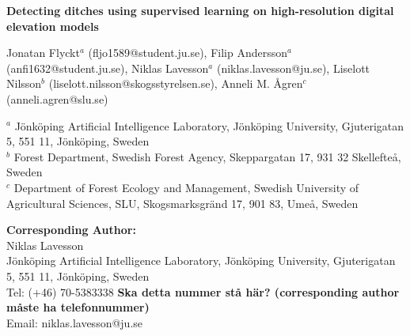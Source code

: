 \documentclass[11pt, review]{elsarticle} %
\begin{document}
\begin{frontmatter}


\begin{titlepage}
\begin{center}
\vspace*{1cm}

\textbf{ \large Detecting ditches using supervised learning on high-resolution digital elevation models}

\vspace{1.5cm}

Jonatan Flyckt$^{a}$ (fljo1589@student.ju.se), Filip Andersson$^{a}$ (anfi1632@student.ju.se), Niklas Lavesson$^a$ (niklas.lavesson@ju.se), Liselott Nilsson$^b$ (liselott.nilsson@skogsstyrelsen.se), Anneli M. \AA gren$^c$ (anneli.agren@slu.se) \\

\hspace{10pt}

\begin{flushleft}
\small  
$^a$ J\"onk\"oping Artificial Intelligence Laboratory, J\"onk\"oping University, Gjuterigatan 5, 551 11, J\"onk\"oping, Sweden \\
$^b$ Forest Department, Swedish Forest Agency, Skeppargatan 17, 931 32 Skellefte\aa, Sweden \\
$^c$ Department of Forest Ecology and Management, Swedish University of Agricultural Sciences, SLU, Skogsmarksgr\"and 17, 901 83, Ume\aa, Sweden

\vspace{1cm}
\textbf{Corresponding Author:} \\
Niklas Lavesson \\
J\"onk\"oping Artificial Intelligence Laboratory, J\"onk\"oping University, Gjuterigatan 5, 551 11, J\"onk\"oping, Sweden \\
Tel: (+46) 70-5383338 \textbf{Ska detta nummer stå här? (corresponding author måste ha telefonnummer)} \\
Email: niklas.lavesson@ju.se

\end{flushleft}        
\end{center}
\end{titlepage}


\end{frontmatter}
\end{document}
